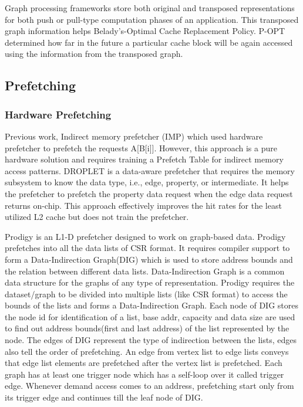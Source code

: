 \documentclass[a4paper,12pt, final]{report}
\begin{document}
Graph processing frameworks store both original and transposed representations for
both push or pull-type computation phases of an application. This transposed graph
information helps Belady's-Optimal Cache Replacement Policy. P-OPT\cite{poptcite8} determined
how far in the future a particular cache block will be again accessed using the information
from the transposed graph.

\subsection{Prefetching}
\subsubsection{Hardware Prefetching}
Previous work, Indirect memory prefetcher (IMP)\cite{IMP} which used hardware prefetcher
to prefetch the requests A[B[i]]. However, this approach is a pure hardware solution and
requires training a Prefetch Table for indirect memory access patterns.
DROPLET\cite{cite4} is a data-aware prefetcher that requires the memory subsystem to know
the data type, i.e., edge, property, or intermediate. It helps the prefetcher to prefetch
the property data request when the edge data request returns on-chip. This approach
effectively improves the hit rates for the least utilized L2 cache but does not train the
prefetcher.

Prodigy\cite{prodigy} is an L1-D prefetcher designed to work on graph-based data.
Prodigy prefetches into all the data lists of CSR format. It requires
compiler support to form a Data-Indirection Graph(DIG) which is used
to store address bounds and the relation between different data lists.
Data-Indirection Graph is a common data structure for the graphs of any
type of representation. Prodigy requires the dataset/graph to be divided
into multiple lists (like CSR format) to access the bounds of the lists and
forms a Data-Indirection Graph. Each node of DIG stores the node id for
identification of a list, base addr, capacity and data size are used to find
out address bounds(first and last address) of the list represented by the
node. The edges of DIG represent the type of indirection between the
lists, edges also tell the order of prefetching. An edge from vertex list to
edge lists conveys that edge list elements are prefetched after the vertex
list is prefetched. Each graph has at least one trigger node which has a
self-loop over it called trigger edge. Whenever demand access comes to
an address, prefetching start only from its trigger edge and continues till
the leaf node of DIG.
\end{document}
